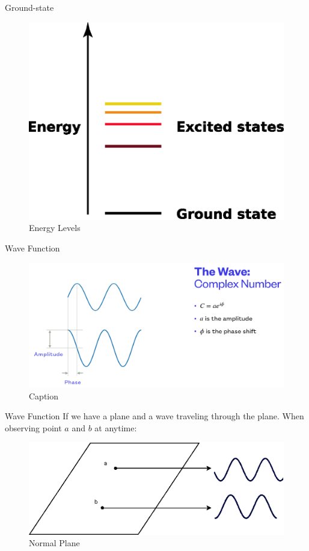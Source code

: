 \documentclass[14pt, aspectratio=169]{beamer}
\begin{document}
\begin{frame}{Ground-state}
    \begin{figure}
        \centering
        \includegraphics[width=0.4\linewidth]{images/illustration/Energy_levels.eps}
        \caption{Energy Levels}
        \label{fig:energy-levels}
    \end{figure}
\end{frame}

\begin{frame}{Wave Function}
    \begin{figure}
        \centering
        \includegraphics[width=\linewidth]{wave_ahmed.png}
        \caption{Caption}
        \label{fig:enter-label}
    \end{figure}
\end{frame}

\begin{frame}{Wave Function}
    If we have a plane and a wave traveling through the plane.
    When observing point $a$ and $b$ at anytime:
    \begin{figure}
        \centering
        \includegraphics[width=0.8\linewidth]{images/illustration/Wave.eps}
        \caption{Normal Plane}
        \label{fig:enter-label}
    \end{figure}
\end{frame}
\end{document}
